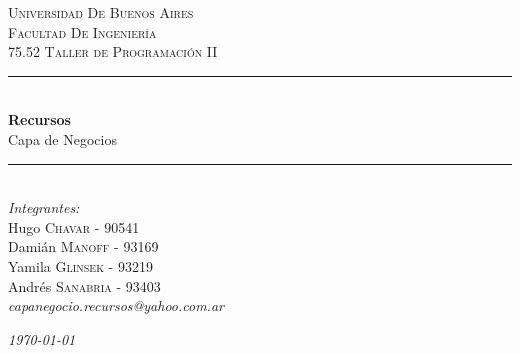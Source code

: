 \documentclass{article}
\begin{document}
\begin{titlepage}

\newcommand{\HRule}{\rule{\linewidth}{0.5mm}} %

\center %
 

\textsc{\LARGE Universidad De Buenos Aires}\\[1.5cm] %
\textsc{\Large Facultad De Ingeniería}\\[0.5cm] %
\textsc{\large 75.52 Taller de Programaci\'on II}\\[0.5cm] %


\HRule \\[0.4cm]
{ \huge \bfseries Recursos}\\ Capa de Negocios\\[0.4cm] %
\HRule \\[1.5cm]
 

\Large \emph{Integrantes:}\\

Hugo \textsc{Chavar} - 90541\\ %
Dami\'an \textsc{Manoff} - 93169\\ %
Yamila \textsc{Glinsek} - 93219\\ %
Andr\'es \textsc{Sanabria} - 93403\\[5cm] %

\textit{capanegocio.recursos@yahoo.com.ar}

{\large \text \em \today }\\[3cm] %
 

\vfill %

\end{titlepage}
\tableofcontents
\newpage
\end{document}
